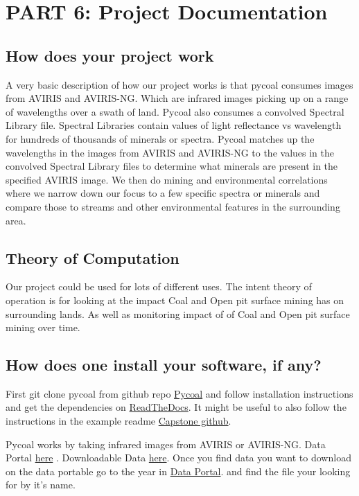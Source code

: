 \documentclass[onecolumn, draftclsnofoot,10pt, compsoc]{IEEEtran}
\begin{document}
\section{PART 6: Project Documentation}
\subsection{How does your project work}
A very basic description of how our project works is that pycoal consumes images from AVIRIS and AVIRIS-NG. Which are infrared images picking up on a range of wavelengths over a swath of land. Pycoal also consumes a convolved Spectral Library file. Spectral Libraries contain values of light reflectance vs wavelength for hundreds of thousands of minerals or spectra. Pycoal matches up the wavelengths in the images from AVIRIS and AVIRIS-NG to the values in the convolved Spectral Library files to determine what minerals are present in the specified AVIRIS image. We then do mining and environmental correlations where we narrow down our focus to a few specific spectra or minerals and compare those to streams and other environmental features in the surrounding area.

\subsection{Theory of Computation}
Our project could be used for lots of different uses. The intent theory of operation is for looking at the impact Coal and Open pit surface mining has on surrounding lands. As well as monitoring impact of of Coal and Open pit surface mining over time. 

\subsection{How does one install your software, if any?}
First git clone pycoal from github repo \href{https://github.com/capstone-coal/pycoal}{Pycoal} and follow installation instructions and get the dependencies on \href{https://capstone-coal.github.io/docs}{ReadTheDocs}. It might be useful to also follow the instructions in the example readme \href{https://github.com/capstone-coal/pycoal/tree/master/examples}{Capstone github}. 

Pycoal works by taking infrared images from AVIRIS or AVIRIS-NG. Data Portal \href{https://avirisng.jpl.nasa.gov/alt_locator/}{here} . Downloadable Data \href{ftp://avng.jpl.nasa.gov/}{here}. Once you find data you want to download on the data portable go to the year in \href{ftp://avng.jpl.nasa.gov/}{Data Portal}. and find the file your looking for by it’s name.
\end{document}
